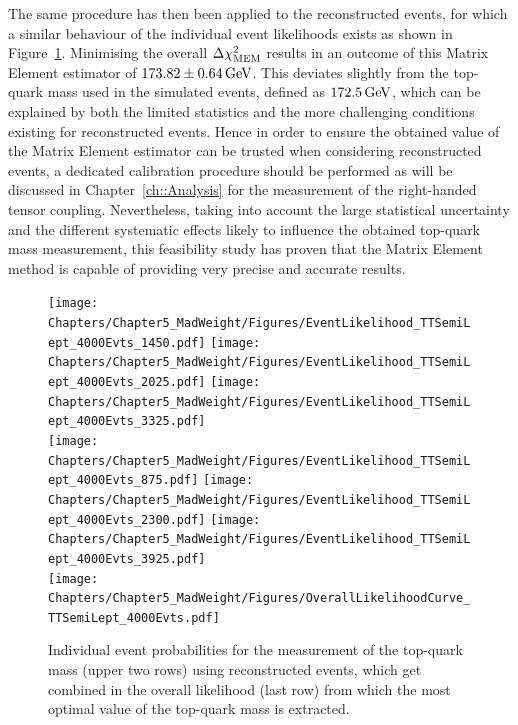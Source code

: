 The same procedure has then been applied to the reconstructed events, for which a similar behaviour of the individual event likelihoods exists as shown in Figure~\ref{fig::EvtProbsMT}.
Minimising the overall $\Delta \chi^{2}_{\textrm{MEM}}$ results in an outcome of this Matrix Element estimator of $173.82 \pm 0.64 \, \mathrm{GeV}$.
This deviates slightly from the top-quark mass used in the simulated events, defined as $172.5 \, \mathrm{GeV}$, which can be explained by both the limited statistics and the more challenging conditions existing for reconstructed events. Hence in order to ensure the obtained value of the Matrix Element estimator can be trusted when considering reconstructed events, a dedicated calibration procedure should be performed as  will be discussed in Chapter~\ref{ch::Analysis} for the measurement of the right-handed tensor coupling.
Nevertheless, taking into account the large statistical uncertainty and the different systematic effects likely to influence the obtained top-quark mass measurement, this feasibility study has proven that the Matrix Element method is capable of providing very precise and accurate results.
\begin{figure}[h!tb]
 \centering
 \texttt{[image: Chapters/Chapter5\_MadWeight/Figures/EventLikelihood\_TTSemiLept\_4000Evts\_1450.pdf]} \vspace{0.2cm}
 \texttt{[image: Chapters/Chapter5\_MadWeight/Figures/EventLikelihood\_TTSemiLept\_4000Evts\_2025.pdf]} \vspace{0.2cm}
 \texttt{[image: Chapters/Chapter5\_MadWeight/Figures/EventLikelihood\_TTSemiLept\_4000Evts\_3325.pdf]} \hspace{0.1cm} \\
 \texttt{[image: Chapters/Chapter5\_MadWeight/Figures/EventLikelihood\_TTSemiLept\_4000Evts\_875.pdf]} \vspace{0.2cm}
 \texttt{[image: Chapters/Chapter5\_MadWeight/Figures/EventLikelihood\_TTSemiLept\_4000Evts\_2300.pdf]} \vspace{0.2cm}
 \texttt{[image: Chapters/Chapter5\_MadWeight/Figures/EventLikelihood\_TTSemiLept\_4000Evts\_3925.pdf]} \hspace{0.1cm} \\
 \texttt{[image: Chapters/Chapter5\_MadWeight/Figures/OverallLikelihoodCurve\_TTSemiLept\_4000Evts.pdf]}
 \caption{Individual event probabilities for the measurement of the top-quark mass (upper two rows) using reconstructed events, which get combined in the overall likelihood (last row) from which the most optimal value of the top-quark mass is extracted.} \label{fig::EvtProbsMT}
\end{figure}
